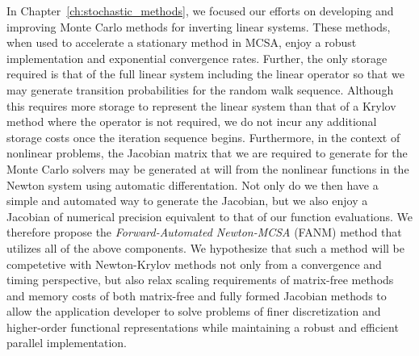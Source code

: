 In Chapter~\ref{ch:stochastic_methods}, we focused our efforts on
developing and improving Monte Carlo methods for inverting linear
systems. These methods, when used to accelerate a stationary method in
MCSA, enjoy a robust implementation and exponential convergence
rates. Further, the only storage required is that of the full linear
system including the linear operator so that we may generate
transition probabilities for the random walk sequence. Although this
requires more storage to represent the linear system than that of a
Krylov method where the operator is not required, we do not incur any
additional storage costs once the iteration sequence
begins. Furthermore, in the context of nonlinear problems, the
Jacobian matrix that we are required to generate for the Monte Carlo
solvers may be generated at will from the nonlinear functions in the
Newton system using automatic differentation. Not only do we then have
a simple and automated way to generate the Jacobian, but we also enjoy
a Jacobian of numerical precision equivalent to that of our function
evaluations. We therefore propose the \textit{Forward-Automated
  Newton-MCSA} (FANM) method that utilizes all of the above
components. We hypothesize that such a method will be competetive with
Newton-Krylov methods not only from a convergence and timing
perspective, but also relax scaling requirements of matrix-free
methods and memory costs of both matrix-free and fully formed Jacobian
methods to allow the application developer to solve problems of finer
discretization and higher-order functional representations while
maintaining a robust and efficient parallel implementation.

